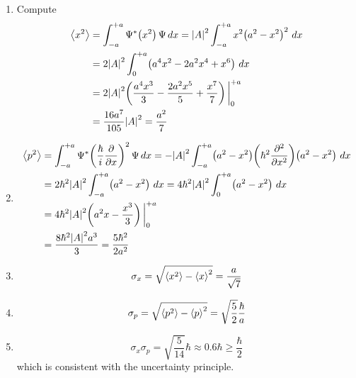 \documentclass[a4paper]{article}
\begin{document}
\begin{enumerate}[label=(\alph*)]
	The reasons for why we cannot simply compute \( \braket{p} = m d \braket{x} / dt \) are as follows: 
	\begin{itemize}[label=\(\circ\)]
		\item As \( \Psi \!\left( x,0 \right) \) is not a function of \( t \), but rather the snapshot of \( \Psi \!\left( x,t \right) \) at \( t = 0 \), knowing \( \braket{x} \) at \( t = 0 \) is insufficient to derive \( d \braket{x} / dt \). It would be equivalent to attempting to differentiate \( f \!\left( 0 \right) \) to derive \( f'\!\left( 0 \right) \), which we could not do. Using the Schr\"odinger equation to evolve \( \Psi \) in time would only be a circuitous way that would take us back to our starting integral. 
	\end{itemize}
	\item Compute
	\begin{align*}
		\braket{x^{2}} & = \int^{+a}_{-a} \Psi^{*}\!\left( x^{2} \right)\Psi \, dx = \abs{A}^{2}\int^{+a}_{-a} x^{2}\!\left( a^{2} - x^{2} \right)^{2} \, dx \\
			       & = 2\abs{A}^{2}\int^{+a}_{0} \!\left( a^{4}x^{2} - 2a^{2}x^{4} + x^{6} \right) \, dx \\
			       & = 2 \abs{A}^{2}\!\left( \frac{a^{4}x^{3}}{3} - \frac{2a^{2}x^{5}}{5} + \frac{x^{7}}{7} \right)\bigg|^{+a}_{0} \\
			       & = \frac{16a^{7}}{105}\abs{A}^{2} = \frac{a^{2}}{7}
	\end{align*}
	\item \begin{align*}
		\braket{p^{2}} & = \int^{+a}_{-a} \Psi^{*}\!\left( \frac{\hbar}{i}\frac{\partial }{\partial x} \right)^{2}\Psi \, dx = -\abs{A}^{2}\int^{+a}_{-a} \!\left( a^{2} - x^{2} \right)\!\left( \hbar^{2}\frac{\partial^{2} }{\partial x^{2}} \right)\!\left( a^{2} - x^{2} \right) \, dx \\
			   & = 2 \hbar^{2} \abs{A}^{2}\int^{+a}_{-a} \!\left( a^{2} - x^{2} \right) \, dx = 4 \hbar^{2}\abs{A}^{2}\int^{+a}_{0} \!\left( a^{2} - x^{2} \right) \, dx \\ 
			   & = 4 \hbar^{2}\abs{A}^{2}\!\left( a^{2}x - \frac{x^{3}}{3} \right)\bigg|^{+a}_{0} \\
			   & = \frac{8 \hbar^{2}\abs{A}^{2}a^{3}}{3} = \frac{5 \hbar^{2}}{2a^{2}}
	\end{align*}
	\item \[
		\sigma_{x} = \sqrt{\braket{x^{2}} - \braket{x}^{2}} = \frac{a}{\sqrt{7}} 
	\]
	\item \[
		\sigma_{p} = \sqrt{\braket{p^{2}} - \braket{p}^{2}} = \sqrt{\frac{5}{2}}\frac{\hbar}{a} 
	\]
	\item \[
		\sigma_{x}\sigma_{p} = \sqrt{\frac{5}{14}}\hbar \approx 0.6 \hbar \ge \frac{\hbar}{2}
	\]
	which is consistent with the uncertainty principle.
\end{enumerate}
\end{document}
